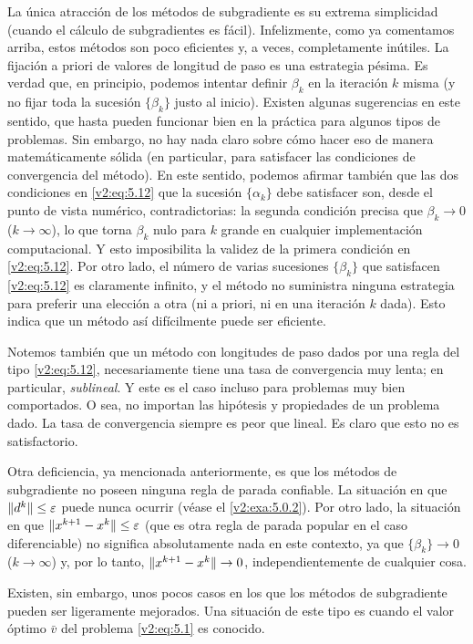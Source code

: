 La única atracción de los métodos de subgradiente es su extrema simplicidad (cuando el cálculo de subgradientes es fácil). Infelizmente, como ya comentamos arriba, estos métodos son poco eficientes y, a veces, completamente inútiles. La fijación a priori de valores de longitud de paso es una estrategia pésima. Es verdad que, en principio, podemos intentar definir $\beta_k$ en la iteración $k$ misma (y no fijar toda la sucesión $\{\beta_k\}$ justo al inicio). Existen algunas sugerencias en este sentido, que hasta pueden funcionar bien en la práctica para algunos tipos de problemas. Sin embargo, no hay nada claro sobre cómo hacer eso de manera matemáticamente sólida (en particular, para satisfacer las condiciones de convergencia del método). En este sentido, podemos afirmar también que las dos condiciones en \eqref{v2:eq:5.12} que la sucesión $\{\alpha_k\}$ debe satisfacer son, desde el punto de vista numérico, contradictorias: la segunda condición precisa que $\beta_k \to 0$ ($k \to \infty$), lo que torna $\beta_k$ nulo para $k$ grande en cualquier implementación computacional. Y esto imposibilita la validez de la primera condición en \eqref{v2:eq:5.12}. Por otro lado, el número de varias sucesiones $\{\beta_k\}$ que satisfacen \eqref{v2:eq:5.12} es claramente infinito, y el método no suministra ninguna estrategia para preferir una elección a otra (ni a priori, ni en una iteración $k$ dada). Esto indica que un método así difícilmente puede ser eficiente.

Notemos también que un método con longitudes de paso dados por una regla del tipo \eqref{v2:eq:5.12}, necesariamente tiene una tasa de convergencia muy lenta; en particular, \textit{sublineal}. Y este es el caso incluso para problemas muy bien comportados. O sea, no importan las hipótesis y propiedades de un problema dado. La tasa de convergencia siempre es peor que lineal. Es claro que esto no es satisfactorio.

Otra deficiencia, ya mencionada anteriormente, es que los métodos de subgradiente no poseen ninguna regla de parada confiable. La situación en que $\lVert d^k\rVert \le \varepsilon$ puede nunca ocurrir (véase el \cref{v2:exa:5.0.2}). Por otro lado, la situación en que $\lVert x^{k+1} - x^k\rVert \le \varepsilon$ (que es otra regla de parada popular en el caso diferenciable) no significa absolutamente nada en este contexto, ya que $\{\beta_k\} \to 0$ ($k \to \infty$) y, por lo tanto, $\lVert x^{k+1} - x^k\rVert \to 0$, independientemente de cualquier cosa.

Existen, sin embargo, unos pocos casos en los que los métodos de subgradiente pueden ser ligeramente mejorados. Una situación de este tipo es cuando el valor óptimo $\bar{v}$ del problema \eqref{v2:eq:5.1} es conocido.

